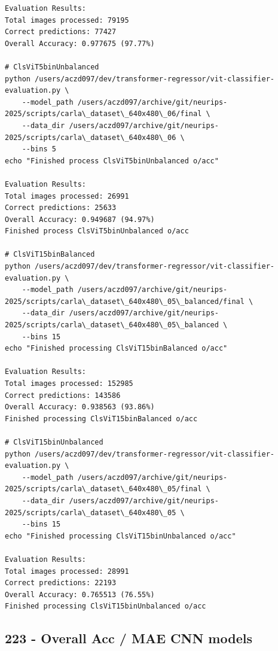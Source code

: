 \begin{verbatim}
Evaluation Results:
Total images processed: 79195
Correct predictions: 77427
Overall Accuracy: 0.977675 (97.77%)

# ClsViT5binUnbalanced
python /users/aczd097/dev/transformer-regressor/vit-classifier-evaluation.py \
    --model_path /users/aczd097/archive/git/neurips-2025/scripts/carla\_dataset\_640x480\_06/final \
    --data_dir /users/aczd097/archive/git/neurips-2025/scripts/carla\_dataset\_640x480\_06 \
    --bins 5
echo "Finished process ClsViT5binUnbalanced o/acc"

Evaluation Results:
Total images processed: 26991
Correct predictions: 25633
Overall Accuracy: 0.949687 (94.97%)
Finished process ClsViT5binUnbalanced o/acc

# ClsViT15binBalanced
python /users/aczd097/dev/transformer-regressor/vit-classifier-evaluation.py \
    --model_path /users/aczd097/archive/git/neurips-2025/scripts/carla\_dataset\_640x480\_05\_balanced/final \
    --data_dir /users/aczd097/archive/git/neurips-2025/scripts/carla\_dataset\_640x480\_05\_balanced \
    --bins 15
echo "Finished processing ClsViT15binBalanced o/acc"

Evaluation Results:
Total images processed: 152985
Correct predictions: 143586
Overall Accuracy: 0.938563 (93.86%)
Finished processing ClsViT15binBalanced o/acc

# ClsViT15binUnbalanced
python /users/aczd097/dev/transformer-regressor/vit-classifier-evaluation.py \
    --model_path /users/aczd097/archive/git/neurips-2025/scripts/carla\_dataset\_640x480\_05/final \
    --data_dir /users/aczd097/archive/git/neurips-2025/scripts/carla\_dataset\_640x480\_05 \
    --bins 15
echo "Finished processing ClsViT15binUnbalanced o/acc"

Evaluation Results:
Total images processed: 28991
Correct predictions: 22193
Overall Accuracy: 0.765513 (76.55%)
Finished processing ClsViT15binUnbalanced o/acc

\end{verbatim}

\subsection{223 - Overall Acc / MAE CNN models}
\label{app_res:223}

